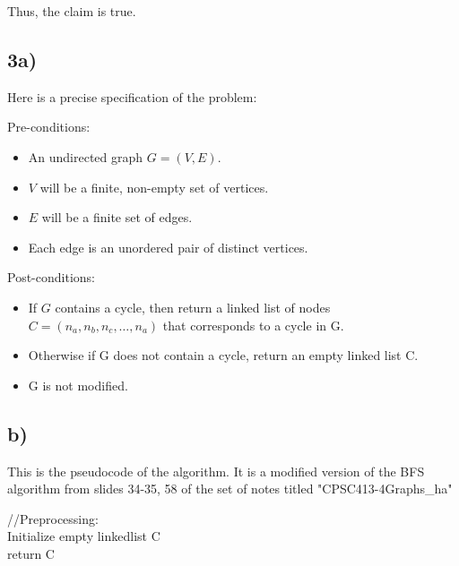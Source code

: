 \documentclass{article}
\begin{document}
Thus, the claim is true.





\subsection*{3a)}

Here is a precise specification of the problem:

Pre-conditions:
\begin{itemize}
    \item An undirected graph $G=(V, E)$. 
    \item $V$ will be a finite, non-empty set of vertices. 
    \item $E$ will be a finite set of edges. 
    \item Each edge is an unordered pair of distinct vertices.
\end{itemize}

Post-conditions: 
\begin{itemize}
    \item If $G$ contains a cycle, then return a linked list of nodes $C = (n_a, n_b, n_c, \dots ,n_a)$ that corresponds to a cycle in G.
    \item Otherwise if G does not contain a cycle, return an empty linked list C.
    \item G is not modified.
\end{itemize}




\subsection*{b)}
This is the pseudocode of the algorithm. It is a modified version of the BFS algorithm from slides 34-35, 58 of the set of notes titled "CPSC413-4Graphs\_ha"

\begin{algorithm}[H]
\DontPrintSemicolon
\SetAlgoLined
{} %

 {
    \;
    //Preprocessing:\\
    Initialize empty linkedlist C\\ 
   \;
    \;
    return C\\
}
\end{algorithm}
\end{document}
